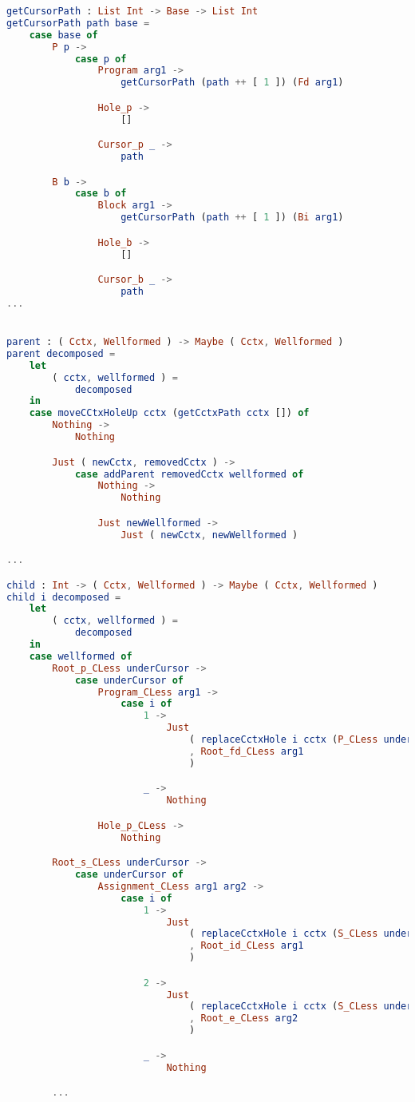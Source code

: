 \begin{lstlisting}[style=inline, language=elm, caption={Generated functions for cursor movement for the C language}, label={lst:c-movement}]
getCursorPath : List Int -> Base -> List Int
getCursorPath path base =
    case base of
        P p ->
            case p of
                Program arg1 ->
                    getCursorPath (path ++ [ 1 ]) (Fd arg1)

                Hole_p ->
                    []

                Cursor_p _ ->
                    path

        B b ->
            case b of
                Block arg1 ->
                    getCursorPath (path ++ [ 1 ]) (Bi arg1)

                Hole_b ->
                    []

                Cursor_b _ ->
                    path
...


parent : ( Cctx, Wellformed ) -> Maybe ( Cctx, Wellformed )
parent decomposed =
    let
        ( cctx, wellformed ) =
            decomposed
    in
    case moveCCtxHoleUp cctx (getCctxPath cctx []) of
        Nothing ->
            Nothing

        Just ( newCctx, removedCctx ) ->
            case addParent removedCctx wellformed of
                Nothing ->
                    Nothing

                Just newWellformed ->
                    Just ( newCctx, newWellformed )

...

child : Int -> ( Cctx, Wellformed ) -> Maybe ( Cctx, Wellformed )
child i decomposed =
    let
        ( cctx, wellformed ) =
            decomposed
    in
    case wellformed of
        Root_p_CLess underCursor ->
            case underCursor of
                Program_CLess arg1 ->
                    case i of
                        1 ->
                            Just
                                ( replaceCctxHole i cctx (P_CLess underCursor)
                                , Root_fd_CLess arg1
                                )

                        _ ->
                            Nothing

                Hole_p_CLess ->
                    Nothing

        Root_s_CLess underCursor ->
            case underCursor of
                Assignment_CLess arg1 arg2 ->
                    case i of
                        1 ->
                            Just
                                ( replaceCctxHole i cctx (S_CLess underCursor)
                                , Root_id_CLess arg1
                                )

                        2 ->
                            Just
                                ( replaceCctxHole i cctx (S_CLess underCursor)
                                , Root_e_CLess arg2
                                )

                        _ ->
                            Nothing

        ...
\end{lstlisting}

